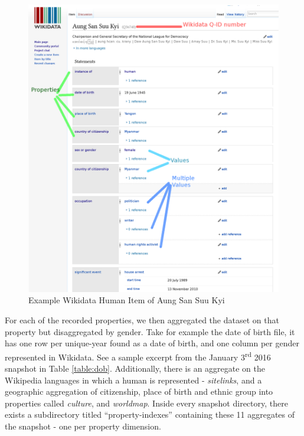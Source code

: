 \documentclass[letterpaper]{article}
\begin{document}
\begin{figure}
\includegraphics[scale=0.15]{figures/aung_explainer.png}
\caption{Example Wikidata Human Item of Aung San Suu Kyi}
\label{fig:aung}
\end{figure}

For each of the recorded properties, we then aggregated the dataset on that property but disaggregated by gender. Take for example the date of birth file, it has one row per unique-year found as a date of birth, and one column per gender represented in Wikidata. See a sample excerpt from the January 3\textsuperscript{rd} 2016 snapshot in Table \ref{table:dob}. Additionally, there is an aggregate on the Wikipedia languages in which a human is represented - \textit{sitelinks}, and a geographic aggregation of citizenship, place of birth and ethnic group into properties called \textit{culture}, and \textit{worldmap}. Inside every snapshot directory, there exists a subdirectory titled ``property-indexes'' containing these 11 aggregates of the snapshot - one per property dimension.
\end{document}
